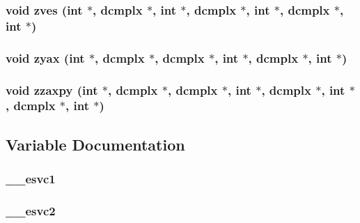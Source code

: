 \subsubsection{\setlength{\rightskip}{0pt plus 5cm}void zves (int $\ast$, {\bf dcmplx} $\ast$, int $\ast$, {\bf dcmplx} $\ast$, int $\ast$, {\bf dcmplx} $\ast$, int $\ast$)}\label{essl_8h_7f366a0e7bfe167a1cf884e39e5ec895}


\subsubsection{\setlength{\rightskip}{0pt plus 5cm}void zyax (int $\ast$, {\bf dcmplx} $\ast$, {\bf dcmplx} $\ast$, int $\ast$, {\bf dcmplx} $\ast$, int $\ast$)}\label{essl_8h_52361d1bd52fd5e0521cc4de4777abc4}


\subsubsection{\setlength{\rightskip}{0pt plus 5cm}void zzaxpy (int $\ast$, {\bf dcmplx} $\ast$, {\bf dcmplx} $\ast$, int $\ast$, {\bf dcmplx} $\ast$, int $\ast$, {\bf dcmplx} $\ast$, int $\ast$)}\label{essl_8h_73d374be7a6319df09c216918d983c04}




\subsection{Variable Documentation}
\subsubsection{ {\bf \_\-\_\-esvc1}}\label{essl_8h_8519770953a9e0b58d0c4e0755684bad}


\subsubsection{ {\bf \_\-\_\-esvc2}}\label{essl_8h_1d1ece72cd3fbf4913d2a4b49c1a109d}



